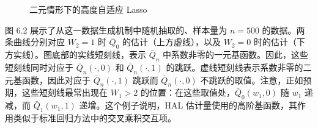 \begin{figure}[htbp]
 \centering
 
 \caption{二元情形下的高度自适应 Lasso}
 \label{fig:ch06-hal-bivariate}
\end{figure}

图 6.2 展示了从这一数据生成机制中随机抽取的、样本量为 $n=500$ 的数据。两条曲线分别对应 $W_2=1$ 时 $\bar Q_0$ 的估计（上方虚线），以及 $W_2=0$ 时的估计（下方实线）。图底部的实线短刻线，表示 $\bar Q_n$ 中系数非零的一元基函数。因此，这些短刻线同时对应于 $\bar Q_n(\cdot,0)$ 和 $\bar Q_n(\cdot,1)$ 的跳跃。虚线短刻线表示系数非零的二元基函数，因此对应于 $\bar Q_n(\cdot,1)$ 跳跃而 $\bar Q_n(\cdot,0)$ 不跳跃的取值。注意，正如预期，这些短刻线最常出现在 $W_1>2$ 的位置：在这些取值处，$\bar Q_0(w_1,0)$ 随 $w_1$ 递减，而 $\bar Q_1(w_1,1)$ 递增。这个例子说明，HAL 估计量使用的高阶基函数，其作用类似于标准回归方法中的交叉乘积交互项。
\FloatBarrier
